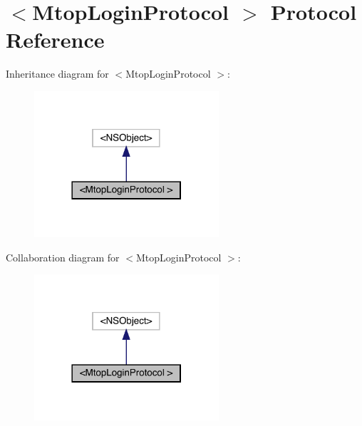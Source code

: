\hypertarget{protocol_mtop_login_protocol_01-p}{}\section{$<$Mtop\+Login\+Protocol $>$ Protocol Reference}
\label{protocol_mtop_login_protocol_01-p}


Inheritance diagram for $<$Mtop\+Login\+Protocol $>$\+:\nopagebreak
\begin{figure}[H]
\begin{center}
\leavevmode
\includegraphics[width=194pt]{protocol_mtop_login_protocol_01-p__inherit__graph}
\end{center}
\end{figure}


Collaboration diagram for $<$Mtop\+Login\+Protocol $>$\+:\nopagebreak
\begin{figure}[H]
\begin{center}
\leavevmode
\includegraphics[width=194pt]{protocol_mtop_login_protocol_01-p__coll__graph}
\end{center}
\end{figure}
